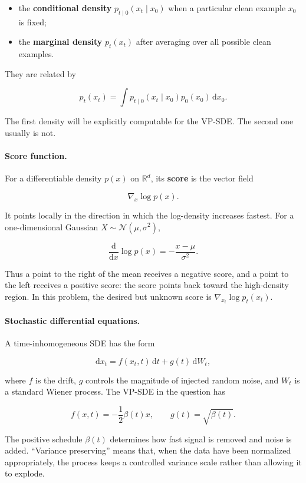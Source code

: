\documentclass[11pt,a4paper]{article}
\theoremstyle{definition}
\begin{document}
\begin{itemize}
    \item the \textbf{conditional density} $p_{t\mid 0}(x_t\mid x_0)$ when a particular clean example $x_0$ is fixed;
    \item the \textbf{marginal density} $p_t(x_t)$ after averaging over all possible clean examples.
\end{itemize}

They are related by

\[
p_t(x_t) = \int p_{t\mid 0}(x_t\mid x_0) p_0(x_0)\, \mathrm{d}x_0.
\]

The first density will be explicitly computable for the VP-SDE. The second one usually is not.

\paragraph{Score function.}
For a differentiable density $p(x)$ on $\mathbb{R}^d$, its \textbf{score} is the vector field

\[
\nabla_x \log p(x).
\]

It points locally in the direction in which the log-density increases fastest. For a one-dimensional Gaussian $X \sim \mathcal{N}(\mu,\sigma^2)$,

\[
\frac{\mathrm{d}}{\mathrm{d}x}\log p(x) = -\frac{x-\mu}{\sigma^2}.
\]

Thus a point to the right of the mean receives a negative score, and a point to the left receives a positive score: the score points back toward the high-density region. In this problem, the desired but unknown score is $\nabla_{x_t}\log p_t(x_t)$.

\paragraph{Stochastic differential equations.}
A time-inhomogeneous SDE has the form

\[
\mathrm{d}x_t = f(x_t,t)\,\mathrm{d}t + g(t)\,\mathrm{d}W_t,
\]

where $f$ is the drift, $g$ controls the magnitude of injected random noise, and $W_t$ is a standard Wiener process. The VP-SDE in the question has

\[
f(x,t) = -\frac{1}{2}\beta(t)x,
\qquad
g(t) = \sqrt{\beta(t)}.
\]

The positive schedule $\beta(t)$ determines how fast signal is removed and noise is added. ``Variance preserving'' means that, when the data have been normalized appropriately, the process keeps a controlled variance scale rather than allowing it to explode.
\end{document}
